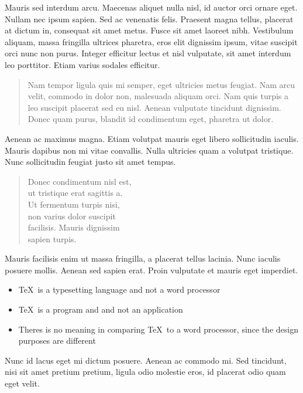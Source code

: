 \documentclass{article}
\begin{document}
Mauris sed interdum arcu. Maecenas aliquet nulla nisl, id auctor orci ornare eget.
Nullam nec ipsum sapien. Sed ac venenatis felis. Praesent magna tellus, placerat at
dictum in, consequat sit amet metus. Fusce sit amet laoreet nibh. Vestibulum aliquam,
massa fringilla ultrices pharetra, eros elit dignissim ipsum, vitae suscipit orci nunc
non purus. Integer efficitur lectus et nisl vulputate, sit amet interdum leo porttitor.
Etiam varius sodales efficitur.

\begin{quote}
Nam tempor ligula quis mi semper, eget ultricies metus feugiat. Nam arcu velit, commodo
in dolor non, malesuada aliquam orci. Nam quis turpis a leo suscipit placerat sed eu nisl.
Aenean vulputate tincidunt dignissim. Donec quam purus, blandit id condimentum eget,
pharetra ut dolor.
\end{quote}

Aenean ac maximus magna. Etiam volutpat mauris eget libero sollicitudin iaculis.
Mauris dapibus non mi vitae convallis. Nulla ultricies quam a volutpat tristique.
Nunc sollicitudin feugiat justo sit amet tempus.

\begin{verse}
Donec condimentum nisl est,\\
ut tristique erat sagittis a.\\
Ut fermentum turpis nisi,\\
non varius dolor suscipit\\
facilisis. Mauris dignissim\\
sapien turpis.
\end{verse}

Mauris facilisis enim ut massa fringilla, a placerat tellus lacinia.
Nunc iaculis posuere mollis. Aenean sed sapien erat. Proin vulputate et
mauris eget imperdiet.

\begin{itemize}
\item \TeX\ is a typesetting language and not a word processor
\item \TeX\ is a program and and not an application
\item Theres is no meaning in comparing \TeX\ to a word processor, since the design
purposes are different
\end{itemize}

Nunc id lacus eget mi dictum posuere. Aenean ac commodo mi. Sed tincidunt, nisi sit
amet pretium pretium, ligula odio molestie eros, id placerat odio quam eget velit.
\end{document}
